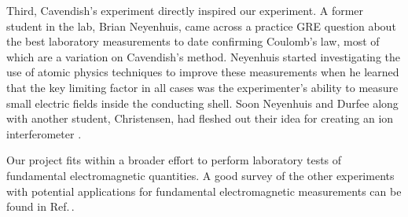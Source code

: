 Third, Cavendish's experiment directly inspired our experiment.
A former student in the lab, Brian Neyenhuis, came across a practice GRE question%
about the best laboratory measurements to date confirming Coulomb's law, most of which are a variation on Cavendish's method. Neyenhuis started investigating the use of atomic physics techniques to improve these measurements when he learned that the key limiting factor in all cases was the experimenter's ability to measure small electric fields inside the conducting shell. Soon Neyenhuis and Durfee along with another student, Christensen, had fleshed out their idea for creating an ion interferometer \cite{christensen_arxiv_calcs} \cite{NeyenhuisIon}.  

Our project fits within a broader effort to perform laboratory tests of fundamental electromagnetic quantities. A good survey of the other experiments with potential applications for fundamental electromagnetic measurements can be found in Ref.\,\cite{PhotonMassSurvey}. 

